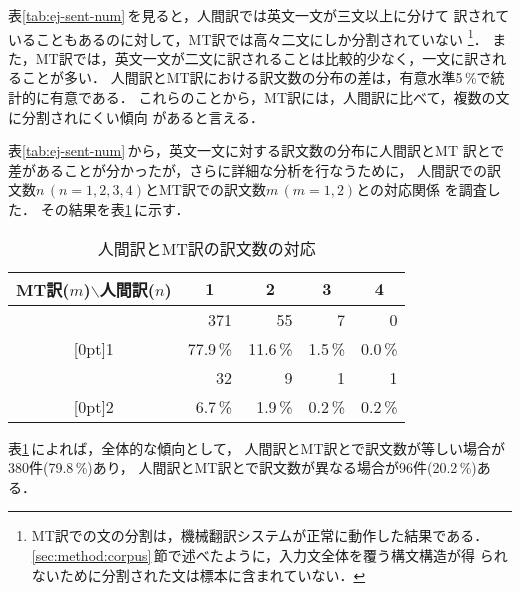 表\ref{tab:ej-sent-num}\,を見ると，人間訳では英文一文が三文以上に分けて
訳されていることもあるのに対して，MT訳では高々二文にしか分割されていない
\footnote{MT訳での文の分割は，機械翻訳システムが正常に動作した結果である．
\ref{sec:method:corpus}\,節で述べたように，入力文全体を覆う構文構造が得
られないために分割された文は標本に含まれていない．}．
また，MT訳では，英文一文が二文に訳されることは比較的少なく，一文に訳され
ることが多い．
人間訳とMT訳における訳文数の分布の差は，有意水準5\,\%で統計的に有意である．
これらのことから，MT訳には，人間訳に比べて，複数の文に分割されにくい傾向
があると言える．

表\ref{tab:ej-sent-num}\,から，英文一文に対する訳文数の分布に人間訳とMT
訳とで差があることが分かったが，さらに詳細な分析を行なうために，
人間訳での訳文数$n\,(n=1,2,3,4)$とMT訳での訳文数$m\,(m=1,2)$との対応関係
を調査した．
その結果を表\ref{tab:ej-sent-num-hum-mt}\,に示す．
\begin{table}[htbp]
\caption{人間訳とMT訳の訳文数の対応}
\label{tab:ej-sent-num-hum-mt}
\begin{center}
\begin{tabular}{|c||r|r|r|r|}\hline
MT訳($m$)$\backslash$人間訳($n$) & \multicolumn{1}{c|}{1} & \multicolumn{1}{c|}{2} & 
\multicolumn{1}{c|}{3} & \multicolumn{1}{c|}{4} \\\hline\hline
 & 371 & 55 & 7 & 0 \\
\raisebox{1.5ex}[0pt]{1}
 & 77.9\,\% & 11.6\,\% & 1.5\,\% & 0.0\,\% \\\hline
 &  32 &  9 & 1 & 1 \\
\raisebox{1.5ex}[0pt]{2}
 & 6.7\,\% & 1.9\,\% & 0.2\,\% & 0.2\,\% \\\hline
\end{tabular}
\end{center}
\end{table}

表\ref{tab:ej-sent-num-hum-mt}\,によれば，全体的な傾向として，
人間訳とMT訳とで訳文数が等しい場合が380件(79.8\,\%)あり，
人間訳とMT訳とで訳文数が異なる場合が96件(20.2\,\%)ある．

